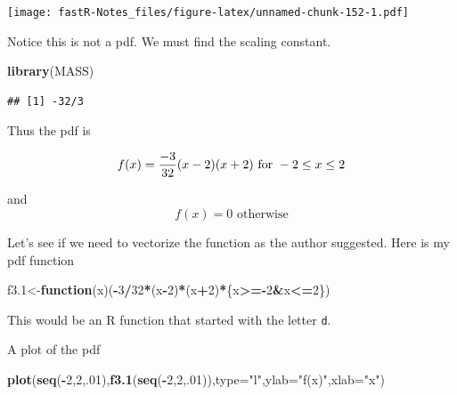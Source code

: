 \documentclass[]{book}
\newenvironment{Shaded}{\begin{snugshade}}{\end{snugshade}}
\newcommand{\KeywordTok}[1]{\textcolor[rgb]{0.13,0.29,0.53}{\textbf{#1}}}
\newcommand{\DataTypeTok}[1]{\textcolor[rgb]{0.13,0.29,0.53}{#1}}
\newcommand{\DecValTok}[1]{\textcolor[rgb]{0.00,0.00,0.81}{#1}}
\newcommand{\StringTok}[1]{\textcolor[rgb]{0.31,0.60,0.02}{#1}}
\newcommand{\OtherTok}[1]{\textcolor[rgb]{0.56,0.35,0.01}{#1}}
\newcommand{\ControlFlowTok}[1]{\textcolor[rgb]{0.13,0.29,0.53}{\textbf{#1}}}
\newcommand{\OperatorTok}[1]{\textcolor[rgb]{0.81,0.36,0.00}{\textbf{#1}}}
\newcommand{\NormalTok}[1]{#1}
\theoremstyle{definition}
\theoremstyle{definition}
\theoremstyle{definition}
\theoremstyle{remark}
\begin{document}
\texttt{[image: fastR-Notes\_files/figure-latex/unnamed-chunk-152-1.pdf]}

Notice this is not a pdf. We must find the scaling constant.

\begin{Shaded}
\begin{Highlighting}[]
\KeywordTok{library}\NormalTok{(MASS)}
\end{Highlighting}
\end{Shaded}

\begin{Shaded}
\end{Shaded}

\begin{verbatim}
## [1] -32/3
\end{verbatim}

Thus the pdf is

\[f(x)={-3 \over 32}(x-2)(x+2) \mbox{ for } -2 \leq x \leq 2\]

and \[f(x)=0 \mbox{ otherwise}\]

Let's see if we need to vectorize the function as the author suggested.
Here is my pdf function

\begin{Shaded}
\begin{Highlighting}[]
\NormalTok{f3.}\DecValTok{1}\NormalTok{<-}\ControlFlowTok{function}\NormalTok{(x)(}\OperatorTok{-}\DecValTok{3}\OperatorTok{/}\DecValTok{32}\OperatorTok{*}\NormalTok{(x}\OperatorTok{-}\DecValTok{2}\NormalTok{)}\OperatorTok{*}\NormalTok{(x}\OperatorTok{+}\DecValTok{2}\NormalTok{)}\OperatorTok{*}\NormalTok{\{x}\OperatorTok{>=-}\DecValTok{2}\OperatorTok{&}\NormalTok{x}\OperatorTok{<=}\DecValTok{2}\NormalTok{\})}
\end{Highlighting}
\end{Shaded}

This would be an R function that started with the letter \texttt{d}.

A plot of the pdf

\begin{Shaded}
\begin{Highlighting}[]
\KeywordTok{plot}\NormalTok{(}\KeywordTok{seq}\NormalTok{(}\OperatorTok{-}\DecValTok{2}\NormalTok{,}\DecValTok{2}\NormalTok{,.}\DecValTok{01}\NormalTok{),}\KeywordTok{f3.1}\NormalTok{(}\KeywordTok{seq}\NormalTok{(}\OperatorTok{-}\DecValTok{2}\NormalTok{,}\DecValTok{2}\NormalTok{,.}\DecValTok{01}\NormalTok{)),}\DataTypeTok{type=}\StringTok{"l"}\NormalTok{,}\DataTypeTok{ylab=}\StringTok{"f(x)"}\NormalTok{,}\DataTypeTok{xlab=}\StringTok{"x"}\NormalTok{)}
\end{Highlighting}
\end{Shaded}
\end{document}
